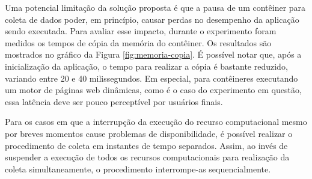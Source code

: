 %
%
%

Uma potencial limitação da solução proposta é que a pausa de um contêiner para coleta de dados poder, em princípio, causar perdas no desempenho da aplicação sendo executada. 
%
Para avaliar esse impacto, durante o experimento foram medidos os tempos de cópia da memória do contêiner.
%
Os resultados são mostrados no gráfico da Figura \ref{fig:memoria-copia}.
%
É possível notar que, após a inicialização da aplicação, o tempo para realizar a cópia é bastante reduzido, variando entre 20 e 40 milissegundos. 
%
Em especial, para contêineres executando um motor de páginas web dinâmicas, como é o caso do experimento em questão, essa latência deve ser pouco perceptível por usuários finais.


Para os casos em que a interrupção da execução do recurso computacional mesmo por breves momentos cause problemas de disponibilidade, é possível realizar o procedimento de coleta em instantes de tempo separados.
%
Assim, ao invés de suspender a execução de todos os recursos computacionais para realização da coleta simultaneamente, o procedimento interrompe-as sequencialmente.

%

